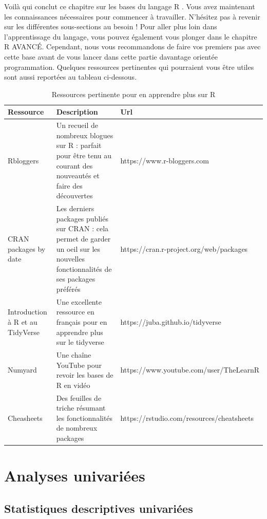 \documentclass[
  11pt,
  french,
]{book}
\begin{document}
Voilà qui conclut ce chapitre sur les bases du langage R . Vous avez maintenant les connaissances nécessaires pour commencer à travailler. N'hésitez pas à revenir sur les différentes sous-sections au besoin ! Pour aller plus loin dans l'apprentissage du langage, vous pouvez également vous plonger dans le chapitre R AVANCÉ. Cependant, nous vous recommandons de faire vos premiers pas avec cette base avant de vous lancer dans cette partie davantage orientée programmation. Quelques ressources pertinentes qui pourraient vous être utiles sont aussi reportées au tableau ci-dessous.

\begin{table}

\caption{\label{tab:tableRessources}Ressources pertinente pour en apprendre plus sur R}
\centering
\fontsize{8}{10}\selectfont
\begin{tabular}[t]{l>{\raggedright\arraybackslash}p{6cm}>{\raggedright\arraybackslash}p{6cm}}
\toprule
Ressource & Description & Url\\
\midrule
Rbloggers & Un recueil de nombreux blogues sur R : parfait pour être tenu au courant des nouveautés et faire des découvertes & https://www.r-bloggers.com\\
CRAN packages by date & Les derniers packages publiés sur CRAN : cela permet de garder un oeil sur les nouvelles fonctionnalités de ses packages préférés & https://cran.r-project.org/web/packages\\
Introduction à R et au TidyVerse & Une excellente ressource en français pour en apprendre plus sur le tidyverse & https://juba.github.io/tidyverse\\
Numyard & Une chaîne YouTube pour revoir les bases de R en vidéo & https://www.youtube.com/user/TheLearnR\\
Cheasheets & Des feuilles de triche résumant les fonctionnalités de nombreux packages & https://rstudio.com/resources/cheatsheets\\
\bottomrule
\end{tabular}
\end{table}

\hypertarget{part-analyses-univariuxe9es}{%
\part{Analyses univariées}\label{part-analyses-univariuxe9es}}

\hypertarget{chap02}{%
\chapter{Statistiques descriptives univariées}\label{chap02}}
\end{document}
